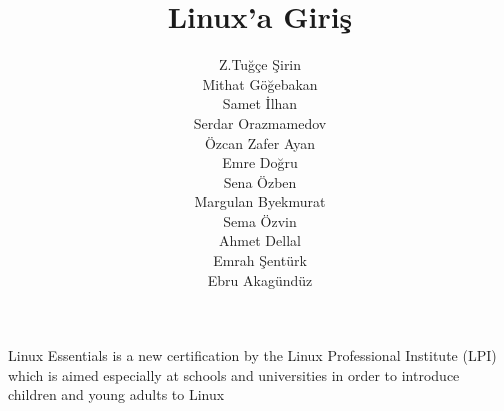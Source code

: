 \documentclass[10pt,a5paper]{book}
\begin{document}
\title{Linux'a Giriş}
\author{Z.Tuğçe Şirin\\
Mithat Göğebakan\\
Samet İlhan\\
Serdar Orazmamedov\\
Özcan Zafer Ayan\\
Emre Doğru\\
Sena Özben\\
Margulan Byekmurat\\
Sema Özvin\\
Ahmet Dellal\\
Emrah Şentürk\\
Ebru Akagündüz}
\renewcommand{\today}{December 13, 2012}
\renewcommand*\chaptername{Bölüm}
\maketitle
Linux Essentials is a new certification by the Linux Professional Institute (LPI) which is aimed especially at schools and universities in order to introduce children and young adults to Linux
\renewcommand*\contentsname{İçindekiler}
\tableofcontents
\listoftables















\end{document}
